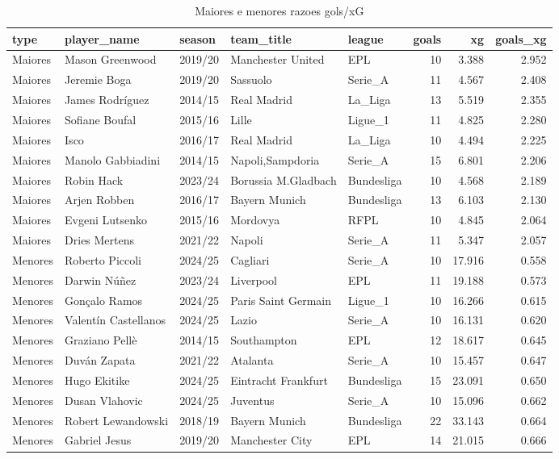 \begin{table}

\caption{\label{tab:extremos_g10}Maiores e menores razoes gols/xG}
\centering
\begin{tabular}[t]{lllllrrr}
\toprule
type & player\_name & season & team\_title & league & goals & xg & goals\_xg\\
\midrule
Maiores & Mason Greenwood & 2019/20 & Manchester United & EPL & 10 & 3.388 & 2.952\\
Maiores & Jeremie Boga & 2019/20 & Sassuolo & Serie\_A & 11 & 4.567 & 2.408\\
Maiores & James Rodríguez & 2014/15 & Real Madrid & La\_Liga & 13 & 5.519 & 2.355\\
Maiores & Sofiane Boufal & 2015/16 & Lille & Ligue\_1 & 11 & 4.825 & 2.280\\
Maiores & Isco & 2016/17 & Real Madrid & La\_Liga & 10 & 4.494 & 2.225\\
\addlinespace
Maiores & Manolo Gabbiadini & 2014/15 & Napoli,Sampdoria & Serie\_A & 15 & 6.801 & 2.206\\
Maiores & Robin Hack & 2023/24 & Borussia M.Gladbach & Bundesliga & 10 & 4.568 & 2.189\\
Maiores & Arjen Robben & 2016/17 & Bayern Munich & Bundesliga & 13 & 6.103 & 2.130\\
Maiores & Evgeni Lutsenko & 2015/16 & Mordovya & RFPL & 10 & 4.845 & 2.064\\
Maiores & Dries Mertens & 2021/22 & Napoli & Serie\_A & 11 & 5.347 & 2.057\\
\addlinespace
Menores & Roberto Piccoli & 2024/25 & Cagliari & Serie\_A & 10 & 17.916 & 0.558\\
Menores & Darwin Núñez & 2023/24 & Liverpool & EPL & 11 & 19.188 & 0.573\\
Menores & Gonçalo Ramos & 2024/25 & Paris Saint Germain & Ligue\_1 & 10 & 16.266 & 0.615\\
Menores & Valentín Castellanos & 2024/25 & Lazio & Serie\_A & 10 & 16.131 & 0.620\\
Menores & Graziano Pellè & 2014/15 & Southampton & EPL & 12 & 18.617 & 0.645\\
\addlinespace
Menores & Duván Zapata & 2021/22 & Atalanta & Serie\_A & 10 & 15.457 & 0.647\\
Menores & Hugo Ekitike & 2024/25 & Eintracht Frankfurt & Bundesliga & 15 & 23.091 & 0.650\\
Menores & Dusan Vlahovic & 2024/25 & Juventus & Serie\_A & 10 & 15.096 & 0.662\\
Menores & Robert Lewandowski & 2018/19 & Bayern Munich & Bundesliga & 22 & 33.143 & 0.664\\
Menores & Gabriel Jesus & 2019/20 & Manchester City & EPL & 14 & 21.015 & 0.666\\
\bottomrule
\end{tabular}
\end{table}
